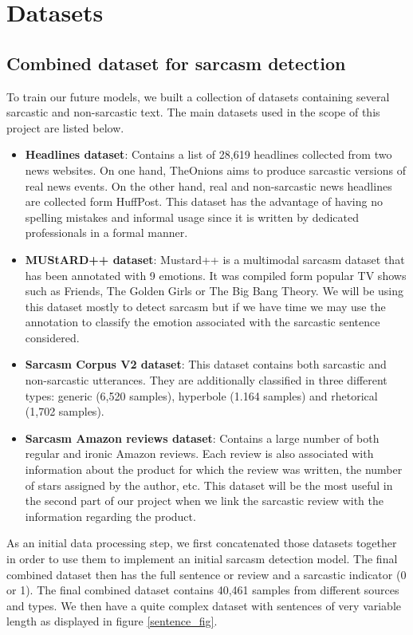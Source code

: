 \documentclass[10pt,twocolumn,letterpaper]{article}
\begin{document}
\section{Datasets}
\subsection{Combined dataset for sarcasm detection}

To train our future models, we built a collection of datasets containing several sarcastic and non-sarcastic text. 
The main datasets used in the scope of this project are listed below.
\begin{itemize}
    \item {\bfseries Headlines dataset}: Contains a list of 28,619 headlines collected from two news websites.
    On one hand, TheOnions aims to produce sarcastic versions of real news events.
    On the other hand, real and non-sarcastic news headlines are collected form HuffPost. This dataset has the advantage of having no spelling mistakes and informal usage since it is written by dedicated professionals in a formal manner.
    \item {\bfseries MUStARD++ dataset}: Mustard++ is a multimodal sarcasm dataset that has been annotated with 9 emotions.
    It was compiled form popular TV shows such as Friends, The Golden Girls or The Big Bang Theory. We will be using this dataset mostly to detect sarcasm but if we have time we may use the annotation to classify the emotion associated with the sarcastic sentence considered.
    \item {\bfseries Sarcasm Corpus V2 dataset}: This dataset contains both sarcastic and non-sarcastic utterances.
    They are additionally classified in three different types: generic (6,520 samples), hyperbole (1.164 samples) and rhetorical (1,702 samples).
    \item {\bfseries Sarcasm Amazon reviews dataset}: Contains a large number of both regular and ironic Amazon reviews.
    Each review is also associated with information about the product for which the review was written, the number of stars assigned by the author, etc.
    This dataset will be the most useful in the second part of our project when we link the sarcastic review with the information regarding the product.
\end{itemize}
As an initial data processing step, we first concatenated those datasets together in order to use them to implement an initial sarcasm detection model. The final combined dataset then has the full sentence or review and a sarcastic indicator (0 or 1). The final combined dataset contains 40,461 samples from different sources and types. We then have a quite complex dataset with sentences of very variable length as displayed in figure \ref*{sentence_fig}.
\end{document}
